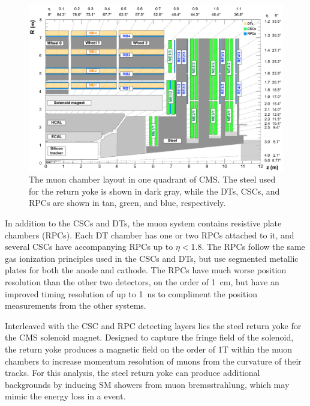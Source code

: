 \begin{figure}[htbp]
    \includegraphics[width=\textwidth]{figures/cms_quadrant_run_ii.pdf}
    \centering
    \caption[Muon chamber layout in Run 2]{The muon chamber layout in one quadrant of CMS. The steel used for the return yoke is shown in dark gray, while the DTs, CSCs, and RPCs are shown in tan, green, and blue, respectively.}
    \label{fig:cscLayout}
\end{figure}

In addition to the CSCs and DTs, the muon system contains resistive plate chambers (RPCs). 
Each DT chamber has one or two RPCs attached to it, and several CSCs have accompanying RPCs up to $\eta<$1.8. 
The RPCs follow the same gas ionization principles used in the CSCs and DTs, but use segmented metallic plates for both the anode and cathode.
The RPCs have much worse position resolution than the other two detectors, on the order of \SI{1}{\centi\meter}, but have an improved timing resolution of up to \SI{1}{\nano\second} to compliment the position measurements from the other systems.

Interleaved with the CSC and RPC detecting layers lies the steel return yoke for the CMS solenoid magnet.
Designed to capture the fringe field of the solenoid, the return yoke produces a magnetic field on the order of 1T within the muon chambers to increase momentum resolution of muons from the curvature of their tracks.
For this analysis, the steel return yoke can produce additional backgrounds by inducing SM showers from muon bremsstrahlung, which may mimic the energy loss in a \dbrem event.

